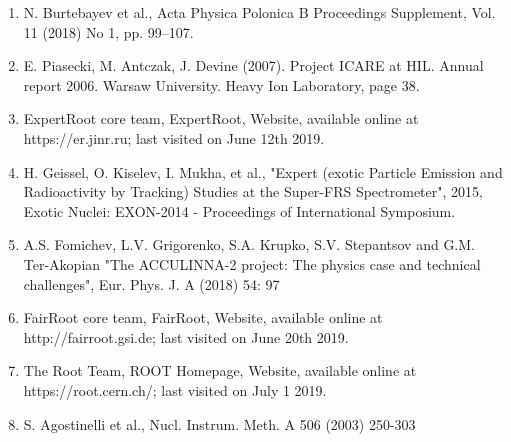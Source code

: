 \documentclass[%
 aip,
cp,  %
 amsmath,amssymb,%
 reprint,%
]{revtex4-2}
\begin{document}
\begin{enumerate}
\item N. Burtebayev et al., Acta Physica Polonica B Proceedings Supplement, Vol. 11 (2018) No 1, pp. 99–107.
\item E. Piasecki, M. Antczak, J. Devine (2007). Project ICARE at HIL. Annual report 2006. Warsaw University. Heavy       Ion Laboratory, page 38.
\item ExpertRoot core team, ExpertRoot, Website, available online at https://er.jinr.ru; last visited on June 12th 2019.
\item H. Geissel, O. Kiselev, I. Mukha, et al., "Expert (exotic Particle Emission and Radioactivity by Tracking) Studies at the Super-FRS Spectrometer", 2015, Exotic Nuclei: EXON-2014 - Proceedings of International Symposium.
\item A.S. Fomichev, L.V. Grigorenko, S.A. Krupko, S.V. Stepantsov and G.M. Ter-Akopian "The ACCULINNA-2 project: The physics case and technical challenges", Eur. Phys. J. A (2018) 54: 97
\item FairRoot core team, FairRoot, Website, available online at http://fairroot.gsi.de; last visited on June 20th 2019.
\item The Root Team, ROOT Homepage, Website, available online at https://root.cern.ch/; last visited on July 1 2019.
\item S. Agostinelli et al., Nucl. Instrum. Meth. A 506 (2003) 250-303

\end{enumerate}
\end{document}
